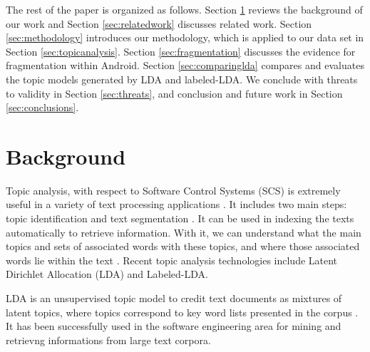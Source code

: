 \documentclass[10pt, conference, compsocconf]{IEEEtran}
\begin{document}
The rest of the paper is organized as follows. Section \ref{sec:background} reviews the
background of our work and Section \ref{sec:relatedwork} discusses related work. Section \ref{sec:methodology}
introduces our methodology, which is applied to our data set in
Section \ref{sec:topicanalysis}. Section \ref{sec:fragmentation}
discusses the evidence for fragmentation within Android. Section \ref{sec:comparinglda} compares and evaluates the topic models generated
by LDA and labeled-LDA. 
We conclude with threats to validity in Section \ref{sec:threats},
and conclusion and future work in
Section \ref{sec:conclusions}.





\section{Background}
\label{sec:background}


Topic analysis, with respect to Software Control Systems (SCS) is extremely useful in a variety of text processing applications \cite{hindle9s}. It includes two main steps: topic identification and text segmentation \cite{li2003topic}. It can be used in indexing the texts automatically to retrieve information.
With it, we can understand what the main topics and sets of associated words with these topics, and where those associated words lie within the text \cite{li2003topic}. Recent topic analysis technologies include Latent Dirichlet Allocation (LDA) and Labeled-LDA.

LDA is an unsupervised topic model to credit text documents as mixtures of latent topics, where topics correspond to key word lists presented in the corpus \cite{ldawiki}. It has been successfully used in the software engineering area for mining and retrievng informations from large text corpora.
\end{document}
